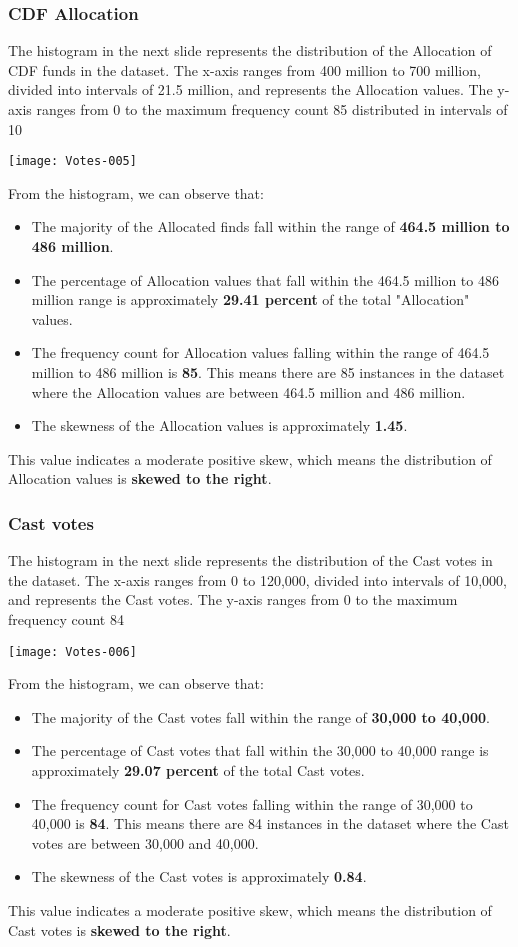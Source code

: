 \documentclass[fleqn,a4paper,12pt]{article}
\begin{document}
\subsubsection{CDF Allocation}

The histogram in the next slide represents the distribution of the Allocation of CDF funds in the dataset. The x-axis ranges from 400 million to 700 million, divided into intervals of 21.5 million, and represents the Allocation values. The y-axis ranges from 0 to the maximum frequency count 85 distributed in intervals of 10

\texttt{[image: Votes-005]}
 
From the histogram, we can observe that:
\begin{itemize}
\item The majority of the Allocated finds fall within the range of \textbf{464.5 million to 486 million}.
\item The percentage of Allocation values that fall within the 464.5 million to 486 million range is approximately \textbf{29.41 percent} of the total "Allocation" values.
\item The frequency count for Allocation values falling within the range of 464.5 million to 486 million is \textbf{85}. This means there are 85 instances in the dataset where the Allocation values are between 464.5 million and 486 million.
\item The skewness of the Allocation values is approximately \textbf{1.45}.
\end{itemize}
This value indicates a moderate positive skew, which means the distribution of Allocation values is \textbf{skewed to the right}.
 
\subsubsection{Cast votes}

The histogram in the next slide represents the distribution of the Cast votes in the dataset. The x-axis ranges from 0 to 120,000, divided into intervals of 10,000, and represents the Cast votes. The y-axis ranges from 0 to the maximum frequency count 84
 

\texttt{[image: Votes-006]}

 
From the histogram, we can observe that:
\begin{itemize}
\item The majority of the Cast votes fall within the range of \textbf{30,000 to 40,000}.
\item The percentage of Cast votes that fall within the 30,000 to 40,000 range is approximately \textbf{29.07 percent} of the total Cast votes.
\item The frequency count for Cast votes falling within the range of 30,000 to 40,000 is \textbf{84}. This means there are 84 instances in the dataset where the Cast votes are between 30,000 and 40,000.
\item The skewness of the Cast votes is approximately \textbf{0.84}.
\end{itemize}
This value indicates a moderate positive skew, which means the distribution of Cast votes is \textbf{skewed to the right}.
 
\end{document}
